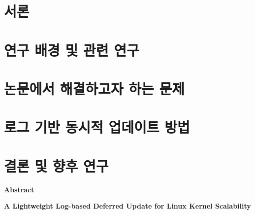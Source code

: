 \documentclass[doctor,korean,final]{kmu}
\begin{document}
\newpage \setcounter{pagemarker}{\value{page}}%

\chapter{서론}

\chapter{연구 배경 및 관련 연구}\label{sec:related}

\chapter{논문에서 해결하고자 하는 문제}\label{sec:problem}

\chapter{로그 기반 동시적 업데이트 방법}




\chapter{결론 및 향후 연구}\label{sec:concl}


%

%



\newpage
{}%
\hfill \break

\noindent
\Large{\textbf{Abstract}}

\noindent
\Large{\textbf{A Lightweight Log-based Deferred Update for Linux Kernel
Scalability}}
\end{document}
